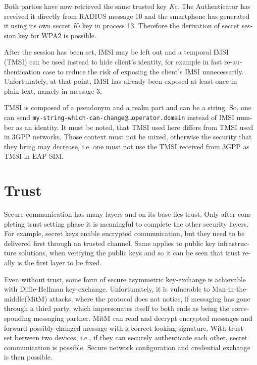 \documentclass[12pt,a4paper,english]{tutthesis}
\begin{document}
\begin{otherlanguage}{english}
Both parties have now retrieved the same trusted key \emph{Kc}. The
Authenticator has received it directly from RADIUS message 10 and the
smartphone has generated it using its own secret \emph{Ki} key in
process 13.
Therefore the derivation of secret session key for WPA2 is possible.

After the session has been set, IMSI may be left out and a temporal IMSI
(TMSI) can be used instead to hide client's identity, for example in
fast re-authentication case to reduce the risk of exposing the client's
IMSI unnecessarily. Unfortunately, at that point, IMSI has already
been exposed at least once in plain text, namely in message 3.

TMSI is composed of a pseudonym and a realm part and can be a
string. So, one can send 
\texttt{my-string-which-can-change@…operator.domain} instead of 
IMSI number as an identity. 
It must be noted, that TMSI used here differs from TMSI used in 3GPP
networks. Those context must not be mixed, otherwise the security that
they bring may decrease, i.e. one must not use the TMSI received from
3GPP as TMSI in EAP-SIM.
\section{Trust}
\label{sec-2-7}

Secure communication has many layers and on its base lies trust. 
Only after completing trust setting phase it is meaningful to complete
the other security layers. For example, secret keys enable encrypted
communication, but they need to be delivered first through an trusted
channel. Same applies to public key infrastructure solutions, when
verifying the public keys and so it can be seen that trust
really is the first layer to be fixed.



Even without trust, some form of secure asymmetric key-exchange is achievable
with Diffie-Hellman key-exchange\cite{diffie1976new}. Unfortunately, it is vulnerable
to Man-in-the-middle(MitM) attacks, where the protocol does not notice, 
if messaging has gone through a third party, which impersonates itself to 
both ends as being the corresponding messaging partner. MitM can
read and decrypt encrypted messages and forward possibly changed message with
a correct looking signature.
With trust set between two devices, i.e.,  if they can securely
authenticate each other, secret communication is possible. 
Secure network configuration and credential exchange is then possible.



\end{otherlanguage}
\end{document}
